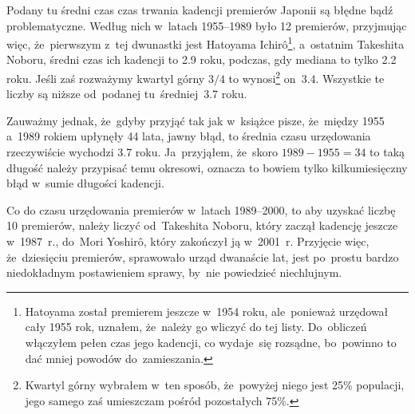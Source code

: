 \documentclass[a4paper,11pt]{article}
\begin{document}
\vspace{\spaceFour}


\start {} Podany tu średni czas czas trwania kadencji premierów
Japonii są błędne bądź problematyczne. Według nich w~latach 1955--1989
było 12 premierów, przyjmując więc, że~pierwszym z~tej dwunastki jest
Hatoyama Ichir\^{o}\footnote{Hatoyama został premierem jeszcze w~1954
  roku, ale~ponieważ urzędował cały 1955 rok, uznałem, że~należy go
  wliczyć do tej listy. Do~obliczeń włączyłem pełen czas jego
  kadencji, co wydaje~się rozsądne, bo~powinno to dać mniej powodów
  do~zamieszania.}, a~ostatnim Takeshita Noboru, średni czas ich
kadencji to 2.9 roku, podczas, gdy mediana to tylko 2.2 roku. Jeśli
zaś rozważymy kwartyl górny $3/4$ to wynosi\footnote{Kwartyl górny
  wybrałem w~ten sposób, że~powyżej niego jest 25\% populacji, jego
  samego zaś umieszczam pośród pozostałych 75\%.} on~3.4. Wszystkie te
liczby są niższe od~podanej tu~średniej~3.7 roku.

Zauważmy jednak, że~gdyby przyjąć tak jak w~książce pisze, że~między
1955 a~1989 rokiem upłynęły 44 lata, jawny błąd, to średnia czasu
urzędowania rzeczywiście wychodzi 3.7 roku. Ja~przyjąłem, że~skoro
$1989 - 1955 = 34$ to taką długość należy przypisać temu okresowi,
oznacza to bowiem tylko kilkumiesięczny błąd w~sumie długości
kadencji.

Co do czasu urzędowania premierów w~latach 1989--2000, to aby uzyskać
liczbę 10 premierów, należy liczyć od~Takeshita Noboru, który zaczął
kadencję jeszcze w~1987~r., do~Mori Yoshir\^{o}, który zakończył ją
w~2001~r. Przyjęcie więc, że~dziesięciu premierów, sprawowało urząd
dwanaście lat, jest po~prostu bardzo niedokładnym postawieniem sprawy,
by~nie powiedzieć niechlujnym.
\end{document}
